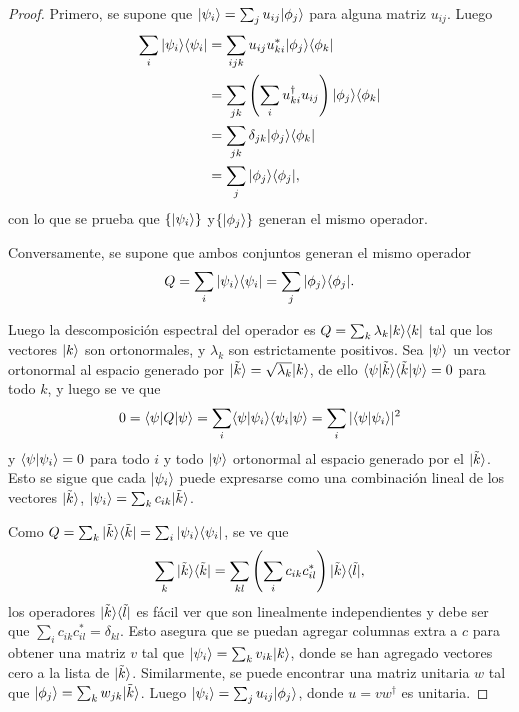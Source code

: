 \begin{proof}
	
	Primero, se supone que $|\psi_i\rangle= \sum_{j}u_{ij}|\phi_j\rangle$ para alguna matriz $u_{ij}$. Luego \begin{equation*}
		\begin{split}
			\sum_{i}|\psi_i\rangle \langle \psi_i|&=\sum_{ijk}u_{ij}u_{ki}^*|\phi_j\rangle \langle \phi_k|\\
			&=\sum_{jk}\left(\sum_i u_{ki}^\dagger u_{ij}\right) |\phi_j\rangle \langle \phi_k|\\
			&=\sum_{jk}\delta_{jk}|\phi_j\rangle \langle \phi_k|\\
			&=\sum_{j} |\phi_j\rangle \langle \phi_j|,\\
	\end{split}
	\end{equation*}	
	con lo que se prueba que $\{|\psi_i\rangle\}$ y$ \{|\phi_j\rangle \}$ generan el mismo operador.
	
	Conversamente, se supone que ambos conjuntos generan el mismo operador 	\[Q=\sum_{i}|\psi_i\rangle \langle \psi_i|=\sum_{j} |\phi_j\rangle \langle \phi_j|.\]
	
	Luego la  descomposición espectral del operador es $Q = \sum_k \lambda_k |k \rangle \langle k|$ tal que los vectores $ |k\rangle$ son ortonormales, y $\lambda_k$ son estrictamente  positivos. Sea $|\psi\rangle$  un vector ortonormal al espacio generado por $|\tilde{k}\rangle=\sqrt{\lambda_k}|k\rangle$, de ello $\langle \psi|\tilde{k}\rangle \langle \tilde{k}|\psi\rangle=0$ para todo $ k$, y luego se ve que 	\[0=\langle \psi |Q|\psi\rangle=\sum_{i}\langle\psi|\psi_i\rangle \langle \psi_i|\psi \rangle =\sum_i |\langle\psi|\psi_i\rangle|^2 \] y $\langle\psi|\psi_i\rangle=0$ para todo $i$ y todo $|\psi \rangle$ ortonormal al espacio generado  por el $|\tilde{k}\rangle$. Esto se sigue que cada $|\psi_i\rangle $ puede expresarse como una combinación lineal de los vectores  $|\tilde{k}\rangle$, $|\psi_i\rangle=\sum_k c_{ik} |\tilde{k}\rangle$. 
	
	Como  $Q=\sum_k  |\tilde{k}\rangle \langle \tilde{k}|=\sum_{i}|\psi_i\rangle \langle\psi_i|$, se ve que \[\sum_k |\tilde{k}\rangle \langle \tilde{k}|=\sum_{kl} \left(\sum_i c_{ik}c_{il}^{*}\right)|\tilde{k}\rangle \langle \tilde{l}|,\] los operadores $|\tilde{k} \rangle \langle \tilde{l}|$ es fácil ver  que son linealmente independientes y debe ser que $\sum_i c_{ik}c_{il}^{*}=\delta_{kl}$. Esto asegura que se puedan agregar columnas extra a $c$ para obtener una matriz $v$ tal que $|\psi_i\rangle=\sum_{k}v_{ik}|k\rangle  $, donde se han agregado  vectores cero a la lista de $|\tilde{k}\rangle$. Similarmente, se puede encontrar una matriz unitaria $w$ tal que $|\phi_j\rangle=\sum_{k}w_{jk}|\tilde{k}\rangle$. Luego $|\psi_i\rangle=\sum_j u_{ij}|\phi_j\rangle$, donde  $u=vw^\dagger$ es unitaria. 
	\end{proof}


